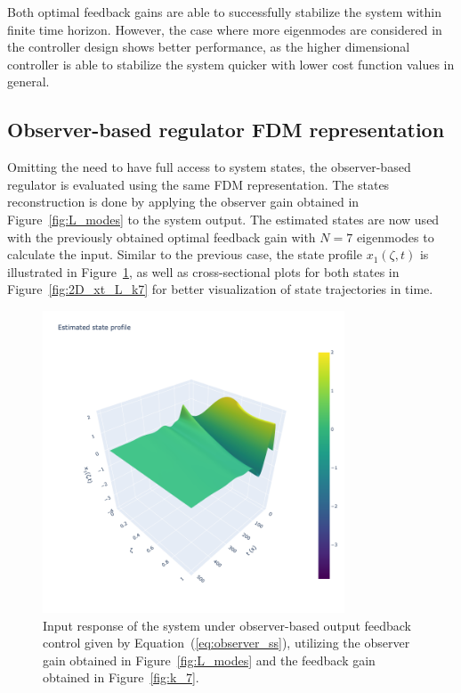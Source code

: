 Both optimal feedback gains are able to successfully stabilize the system within finite time horizon. However, the case where more eigenmodes are considered in the controller design shows better performance, as the higher dimensional controller is able to stabilize the system quicker with lower cost function values in general.

\subsection{Observer-based regulator FDM representation} \label{sec:observer}

Omitting the need to have full access to system states, the observer-based regulator is evaluated using the same FDM representation. The states reconstruction is done by applying the observer gain obtained in Figure~\ref{fig:L_modes} to the system output. The estimated states are now used with the previously obtained optimal feedback gain with $N=7$ eigenmodes to calculate the input. Similar to the previous case, the state profile $x_1(\zeta,t)$ is illustrated in Figure~\ref{fig:3D_x1_L_k7}, as well as cross-sectional plots for both states in Figure~\ref{fig:2D_xt_L_k7} for better visualization of state trajectories in time.

\begin{figure}[!htbp]
    \centering
    \includegraphics[width=0.8\textwidth,trim=0 0 100 0,clip]{Figures/3D_x1_L_k7.png}
    \caption{Input response of the system under observer-based output feedback control given by Equation~(\ref{eq:observer_ss}), utilizing the observer gain obtained in Figure~\ref{fig:L_modes} and the feedback gain obtained in Figure~\ref{fig:k_7}.}
    \label{fig:3D_x1_L_k7}
\end{figure}

